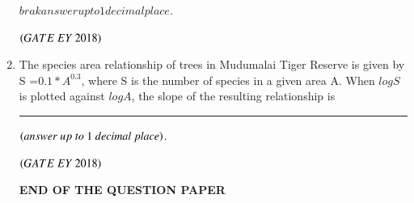 \documentclass[journal]{IEEEtran}
\numberwithin{equation}{enumi}
\numberwithin{figure}{enumi}
\begin{document}
\begin{enumerate}
$brak{answer up to 1 decimal place}$.
   
    \hfill{$\brak{ GATE\ EY\ 2018}$}
    \bigskip
 \item The species area relationship of trees in Mudumalai Tiger Reserve is given by
S =$0.1 * A^{0.3}$, where S is the number of species in a given area A. When $log S$ is
plotted against $log A$, the slope of the resulting relationship is\rule{3cm}{0.15mm}


$\brak{answer\ up\ to\ 1\ decimal\ place}$.
   
    \hfill{$\brak{ GATE\ EY\ 2018}$}
    \bigskip
    \begin{center}
\Large
\textbf{END OF THE QUESTION PAPER}
\end{center}
\end{enumerate}
\end{document}
